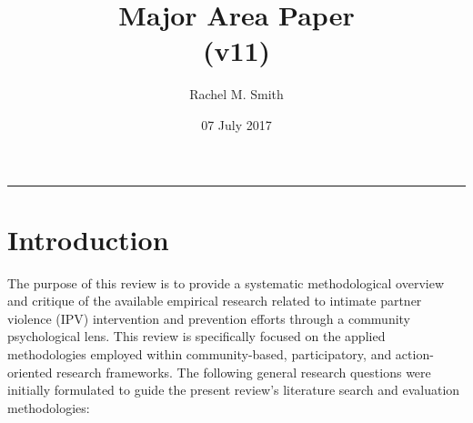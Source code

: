 \documentclass[11pt,]{tufte-book}
\title{Major Area Paper\\
(v11)}
\author{Rachel M. Smith}
\date{07 July 2017}
\newcommand{\Frule}{
    \vspace*{-1em}
    \begin{fullwidth}\textcolor{blublk}{\rule{\linewidth}{0.2mm}}\end{fullwidth}
}
\begin{document}
\maketitle



{
\setcounter{tocdepth}{1}
\tableofcontents
}

\makeatletter
\def\LT@makenoprefixcaption#1#2#3{%
  \LT@mcol\LT@cols c{\hbox to\z@{\hss\parbox[t]\LTcapwidth{
    \sbox\@tempboxa{#1{}#3}
    \ifdim\wd\@tempboxa>\hsize
      #1{}#3
    \else
      \hbox to\hsize{\hfil\box\@tempboxa\hfil}%
    \fi
    \endgraf\vskip\baselineskip}
  \hss}}}
\makeatother

\makeatletter
\let\LT@oldmakecaption=\LT@makecaption
\let\oldthetable=\thetable
\let\oldtheHtable=\theHtable
\makeatother

\makeatletter
{}
\newenvironment{no-prefix-table-caption}{
  \let\LT@makecaption=\LT@makenoprefixcaption
  \renewcommand\thetable{x.\thetableno}
  \renewcommand\theHtable{x.\thetableno}
  \stepcounter{tableno}
}{
  \let\thetable=\oldthetable
  \let\theHtable=\oldtheHtable
  \let\LT@makecaption=\LT@oldmakecaption
  \addtocounter{table}{-1}
}
\makeatother

\newcommand{\plusnamesingular}{}
\newcommand{\starnamesingular}{}
\newcommand{\xrefname}[1]{\protect\renewcommand{\plusnamesingular}{#1}}
\newcommand{\Xrefname}[1]{\protect\renewcommand{\starnamesingular}{#1}}
\providecommand{\cref}{\plusnamesingular~\ref}
\providecommand{\Cref}{\starnamesingular~\ref}
\providecommand{\crefformat}[2]{}
\providecommand{\Crefformat}[2]{}

\crefformat{figure}{Figure~#2#1#3}
\Crefformat{figure}{Figure~#2#1#3}
\crefformat{table}{Table~#2#1#3}
\Crefformat{table}{Table~#2#1#3}

\Frule

\chapter{Introduction}\label{introduction}

The purpose of this review is to provide a systematic methodological
overview and critique of the available empirical research related to
intimate partner violence (IPV) intervention and prevention efforts
through a community psychological lens. This review is specifically
focused on the applied methodologies employed within community-based,
participatory, and action-oriented research frameworks. The following
general research questions were initially formulated to guide the
present review's literature search and evaluation methodologies:
\end{document}
